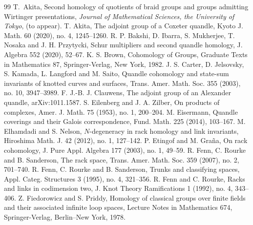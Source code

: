 \documentclass[10pt,a4paper]{amsart}
\begin{document}
\begin{thebibliography}{99}
 T.~Akita, \newblock Second homology of quotients of braid groups and groups admitting Wirtinger presentations, \newblock \emph{Journal of Mathematical Sciences, the University of Tokyo}, (to appear).
 T. Akita, \newblock The adjoint group of a Coxeter quandle, \newblock Kyoto J. Math. 60 (2020), no. 4, 1245--1260.
 R. P. Bakshi, D. Ibarra, S. Mukherjee, T. Nosaka and J. H. Przytycki, \newblock Schur multipliers and second quandle homology, \newblock J. Algebra 552 (2020), 52--67.
 K. S. Brown, \newblock Cohomology of Groups, \newblock Graduate Texts in Mathematics 87, \newblock Springer-Verlag, New York, 1982.
 J. S. Carter, D. Jelsovsky, S. Kamada, L. Langford and M. Saito, \newblock Quandle cohomology and state-sum invariants of knotted curves and surfaces, \newblock Trans. Amer. Math. Soc. 355 (2003), no. 10, 3947--3989.
 F. J.-B. J. Clauwens, \newblock The adjoint group of an Alexander quandle, \newblock arXiv:1011.1587.
 S. Eilenberg and J. A. Zilber, \newblock On products of complexes, \newblock Amer. J. Math. 75 (1953), no. 1, 200--204.
 M. Eisermann, \newblock Quandle coverings and their Galois correspondence, \newblock Fund. Math. 225 (2014), 103--167.
 M. Elhamdadi and S. Nelson, \newblock $N$-degeneracy in rack homology and link invariants, \newblock Hiroshima Math. J. 42 (2012), no. 1, 127--142.
 P. Etingof and M. Gra\~na, \newblock On rack cohomology, \newblock J. Pure Appl. Algebra 177 (2003), no. 1, 49--59.
 R. Fenn, C. Rourke and B. Sanderson, \newblock The rack space, \newblock Trans. Amer. Math. Soc. 359 (2007), no. 2, 701--740.
 R. Fenn, C. Rourke and B. Sanderson, \newblock Trunks and classifying spaces, \newblock Appl. Categ. Structures 3 (1995), no. 4, 321--356.
 R. Fenn and C. Rourke, \newblock Racks and links in codimension two, \newblock J. Knot Theory Ramifications 1 (1992), no. 4, 343--406.
 Z. Fiedorowicz and S. Priddy, \newblock Homology of classical groups over finite fields and their associated infinite loop spaces, \newblock Lecture Notes in Mathematics 674, \newblock Springer-Verlag, Berlin--New York, 1978.

\end{thebibliography}
\end{document}
